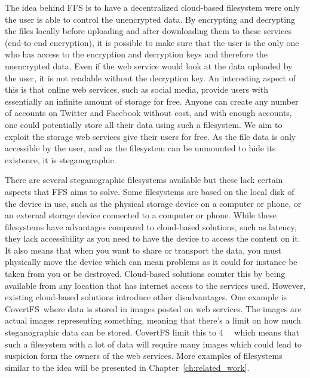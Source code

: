 The idea behind FFS is to have a decentralized cloud-based filesystem were only the user is able to control the unencrypted data. By encrypting and decrypting the files locally before uploading and after downloading them to these services (end-to-end encryption), it is possible to make sure that the user is the only one who has access to the encryption and decryption keys and therefore the unencrypted data. Even if the web service would look at the data uploaded by the user, it is not readable without the decryption key. An interesting aspect of this is that online web services, such as social media, provide users with essentially an infinite amount of storage for free. Anyone can create any number of accounts on Twitter and Facebook without cost, and with enough accounts, one could potentially store all their data using such a filesystem. We aim to exploit the storage web services give their users for free. As the file data is only accessible by the user, and as the filesystem can be unmounted to hide its existence, it is steganographic. 

There are several steganographic filesystems available but these lack certain aspects that FFS aims to solve. Some filesystems are based on the local disk of the device in use, such as the physical storage device on a computer or phone, or an external storage device connected to a computer or phone. While these filesystems have advantages compared to cloud-based solutions, such as latency, they lack accessibility as you need to have the device to access the content on it. It also means that when you want to share or transport the data, you must physically move the device which can mean problems as it could for instance be taken from you or be destroyed. Cloud-based solutions counter this by being available from any location that has internet access to the services used. However, existing cloud-based solutions introduce other disadvantages. One example is CovertFS\,\cite{baliga2007web} where data is stored in images posted on web services. The images are actual images representing something, meaning that there's a limit on how much steganographic data can be stored. CovertFS limit this to \SI{4}{\kilo\byte} which means that such a filesystem with a lot of data will require many images which could lead to suspicion form the owners of the web services. More examples of filesystems similar to the idea will be presented in Chapter~\ref{ch:related_work}. 